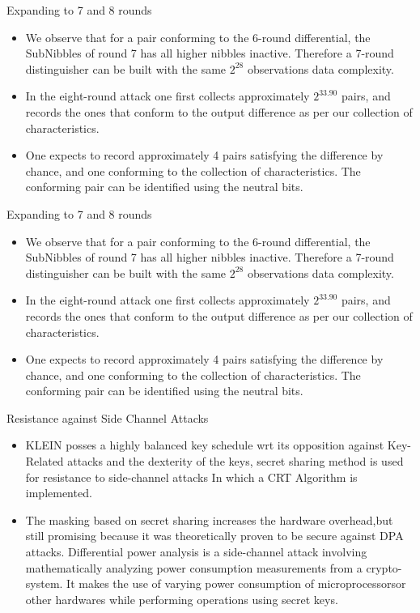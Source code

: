 \begin{frame}{Expanding to 7 and 8 rounds}
	\begin{itemize}
		\item We observe that for a pair conforming to the 6-round
differential, the SubNibbles of round 7 has all higher nibbles
inactive. Therefore a 7-round distinguisher can be built
with the same $2^{28}$ observations data complexity.
\item In the eight-round attack one first collects approximately $2^{33.90}$ pairs, and records the ones that conform to the output difference as per our collection of characteristics.
\item One expects to record approximately 4 pairs satisfying the
difference by chance, and one conforming to the collection
of characteristics. The conforming pair can be identified
using the neutral bits.
	\end{itemize}
\end{frame}

\begin{frame}{Expanding to 7 and 8 rounds}
	\begin{itemize}
		\item We observe that for a pair conforming to the 6-round
differential, the SubNibbles of round 7 has all higher nibbles
inactive. Therefore a 7-round distinguisher can be built
with the same $2^{28}$ observations data complexity.
\item In the eight-round attack one first collects approximately $2^{33.90}$ pairs, and records the ones that conform to the output difference as per our collection of characteristics.
\item One expects to record approximately 4 pairs satisfying the
difference by chance, and one conforming to the collection
of characteristics. The conforming pair can be identified
using the neutral bits.
	\end{itemize}
\end{frame}

\begin{frame}{Resistance against Side Channel Attacks}
	\begin{itemize}
		\item KLEIN posses a highly balanced key schedule wrt its opposition against Key-Related attacks and the dexterity of the keys, secret sharing method is used for resistance to side-channel attacks In which a CRT Algorithm is implemented.
				\item The masking based on secret sharing increases the hardware overhead,but still promising because it was theoretically proven to be secure against DPA attacks. Differential power analysis is a side-channel attack involving mathematically analyzing power consumption measurements from a crypto-system. It makes the use of varying power consumption of microprocessorsor other hardwares while performing operations using secret keys.
	\end{itemize}
\end{frame}



